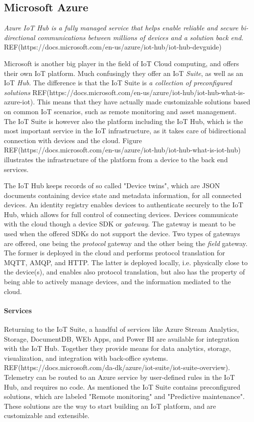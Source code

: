 \subsection{Microsoft Azure}
\textit{Azure IoT Hub is a fully managed service that helps enable reliable and secure bi-directional communications between millions of devices and a solution back end.} REF(https://docs.microsoft.com/en-us/azure/iot-hub/iot-hub-devguide)

Microsoft is another big player in the field of IoT Cloud computing, and offers their own IoT platform. Much confusingly they offer an IoT \textit{Suite}, as well as an IoT \textit{Hub}. The difference is that the IoT Suite is \textit{a collection of preconfigured solutions} REF(https://docs.microsoft.com/en-us/azure/iot-hub/iot-hub-what-is-azure-iot). This means that they have actually made customizable solutions based on common IoT scenarios, such as remote monitoring and asset management. The IoT Suite is however also the platform including the IoT Hub, which is the most important service in the IoT infrastructure, as it takes care of bidirectional connection with devices and the cloud. Figure REF(https://docs.microsoft.com/en-us/azure/iot-hub/iot-hub-what-is-iot-hub) illustrates the infrastructure of the platform from a device to the back end services. 

The IoT Hub keeps records of so called "Device twins", which are JSON documents containing device state and metadata information, for all connected devices. An identity registry enables devices to authenticate securely to the IoT Hub, which allows for full control of connecting devices. Devices communicate with the cloud though a device SDK or \textit{gateway}. The gateway is meant to be used when the offered SDKs do not support the device. Two types of gateways are offered, one being the \textit{protocol} gateway and the other being the \textit{field} gateway. The former is deployed in the cloud and performs protocol translation for MQTT, AMQP, and HTTP. The latter is deployed locally, i.e. physically close to the device(s), and enables also protocol translation, but also has the property of being able to actively manage devices, and the information mediated to the cloud. \\


\paragraph{Services}
Returning to the IoT Suite, a handful of services like Azure Stream Analytics, Storage, DocumentDB, WEb Apps, and Power BI are available for integration with the IoT Hub. Together they provide means for data analytics, storage, visualization, and integration with back-office systems. REF(https://docs.microsoft.com/da-dk/azure/iot-suite/iot-suite-overview). Telemetry can be routed to an Azure service by user-defined rules in the IoT Hub, and requires no code. As mentioned the IoT Suite contains preconfigured solutions, which are labeled "Remote monitoring" and "Predictive maintenance". These solutions are the way to start building an IoT platform, and are customizable and extensible. 

